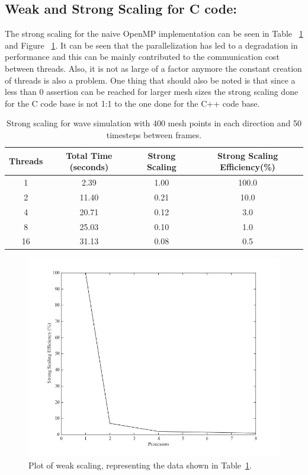 \documentclass[12pt]{article}
\begin{document}
\subsection{Weak and Strong Scaling for C code:}

The strong scaling for the naive OpenMP implementation can be seen in Table ~\ref{sscale_c} and Figure ~\ref{ssplot_c}. It can be seen that the parallelization has led to a degradation in performance and this can be mainly contributed to the communication cost between threads. Also, it is not as large of a factor anymore the constant creation of threads is also a problem. One thing that should also be noted is that since a less than 0 assertion can be reached for larger mesh sizes the strong scaling done for the C code base is not 1:1 to the one done for the C++ code base.

\begin{table}[h]
	\begin{center}
		\begin{tabular}{|c c c c|}
			\hline
			Threads & Total Time (seconds) & Strong Scaling & Strong Scaling Efficiency(\%) \\ \hline
			1 & 2.39 & 1.00  & 100.0 \\ \hline
			2 & 11.40 & 0.21 &  10.0 \\ \hline
			4 & 20.71 &  0.12&  3.0  \\ \hline
			8 & 25.03 &  0.10&  1.0  \\ \hline
			16 & 31.13 &  0.08& 0.5   \\ \hline
		\end{tabular}
		\caption{Strong scaling for wave simulation with 400 mesh points in each direction and 50 timesteps between frames.}
		\label{sscale_c}
	\end{center}
\end{table}

		\begin{figure}[h]
			\begin{center}
				\includegraphics[width=0.5\columnwidth]{sscale_plot}
				\caption{Plot of weak scaling, representing the data shown in Table~\ref{sscale_c}.}
				\label{ssplot_c}
			\end{center}
		\end{figure}
\end{document}
